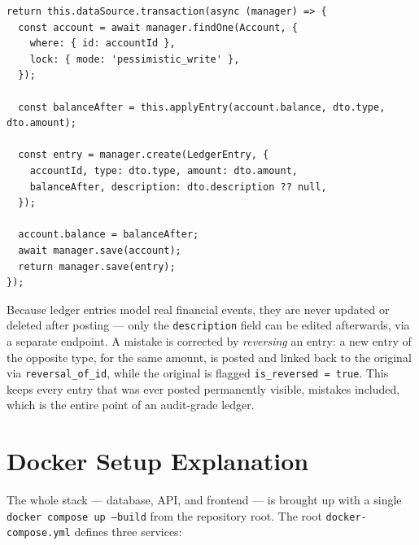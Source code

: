 \documentclass[11pt]{article}
\begin{document}
\begin{lstlisting}[caption={Simplified core of \texttt{LedgerService.createEntry}}]
return this.dataSource.transaction(async (manager) => {
  const account = await manager.findOne(Account, {
    where: { id: accountId },
    lock: { mode: 'pessimistic_write' },
  });

  const balanceAfter = this.applyEntry(account.balance, dto.type, dto.amount);

  const entry = manager.create(LedgerEntry, {
    accountId, type: dto.type, amount: dto.amount,
    balanceAfter, description: dto.description ?? null,
  });

  account.balance = balanceAfter;
  await manager.save(account);
  return manager.save(entry);
});
\end{lstlisting}

Because ledger entries model real financial events, they are never
updated or deleted after posting --- only the \texttt{description} field
can be edited afterwards, via a separate endpoint. A mistake is corrected
by \emph{reversing} an entry: a new entry of the opposite type, for the
same amount, is posted and linked back to the original via
\texttt{reversal\_of\_id}, while the original is flagged
\texttt{is\_reversed = true}. This keeps every entry that was ever posted
permanently visible, mistakes included, which is the entire point of an
audit-grade ledger.

\section{Docker Setup Explanation}

The whole stack --- database, API, and frontend --- is brought up with a
single \texttt{docker compose up --build} from the repository root. The
root \texttt{docker-compose.yml} defines three services:
\end{document}
